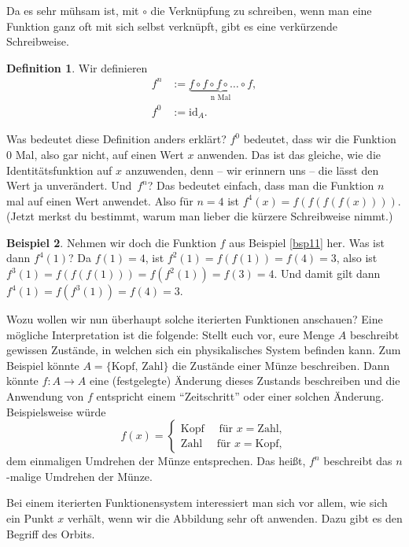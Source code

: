 \documentclass[a4paper,ngerman,12pt]{zirkelblatt1415}
\theoremstyle{definition}
\newtheorem{definition}{Definition}
\newtheorem{beispiel}[definition]{Beispiel}
\theoremstyle{remark}
\newcommand{\lra}{\longrightarrow}
\newcommand{\id}{\text{id}}
\begin{document}
Da es sehr mühsam ist, mit $\circ$ die Verknüpfung zu schreiben, wenn man eine Funktion ganz oft mit sich selbst verknüpft, 
gibt es eine verkürzende Schreibweise.

\begin{definition}
Wir definieren
\begin{align*}
f^n &:= \underbrace{f \circ f \circ f \circ \ldots \circ f}_{\text{n Mal}}, \\
f^0 &:= \id_A.
\end{align*} 
\end{definition}
Was bedeutet diese Definition anders erklärt? $f^0$ bedeutet, dass wir die Funktion $0$ Mal, also gar nicht, auf einen Wert $x$ anwenden.
Das ist das gleiche, wie die Identitätsfunktion auf $x$ anzuwenden, denn -- wir erinnern uns -- die lässt den Wert ja unverändert.
Und~$f^n$? Das bedeutet einfach, dass man die Funktion $n$ mal auf einen Wert anwendet. Also für $n = 4$ 
ist $f^4 (x) = f(f(f(f(x))))$. (Jetzt merkst du bestimmt, warum man lieber die kürzere Schreibweise nimmt.)

\begin{beispiel}
 Nehmen wir doch die Funktion $f$ aus Beispiel \ref{bsp11} her.
 Was ist dann $f^4(1)$? Da $f(1) = 4$, ist $f^2(1) = f(f(1)) = f(4) = 3$, also ist $f^3(1) = f(f(f(1))) = f(f^2(1)) = f(3) = 4$.
 Und damit gilt dann $f^4(1) = f(f^3(1)) = f(4) = 3$.
\end{beispiel}


Wozu wollen wir nun überhaupt solche iterierten Funktionen anschauen? 
Eine mögliche Interpretation ist die folgende: 
Stellt euch vor, eure Menge $A$ beschreibt gewissen Zustände, in welchen sich ein physikalisches System befinden kann. 
Zum Beispiel könnte $A=\{\text{Kopf, Zahl}\}$ die Zustände einer Münze beschreiben. 
Dann könnte $f:A\lra A$ eine (festgelegte) Änderung dieses Zustands beschreiben und die Anwendung von $f$ entspricht einem "`Zeitschritt"' oder einer solchen Änderung. 
Beispielsweise würde
\begin{equation*}
  f(x)=\begin{cases} \text{Kopf} \quad \text{ für } x=\text{Zahl},\\ \text{Zahl} \quad \text{ für }x=\text{Kopf},\end{cases}
\end{equation*}
dem einmaligen Umdrehen der Münze entsprechen. Das heißt, $f^n$ beschreibt das $n$-malige Umdrehen der Münze.

Bei einem iterierten Funktionensystem interessiert man sich vor allem, wie sich ein Punkt $x$ verhält, wenn wir die Abbildung sehr oft anwenden. 
Dazu gibt es den Begriff des Orbits.
\end{document}
